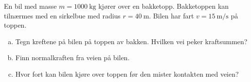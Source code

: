 %
En bil med masse $m = \SI{1000}{\kilo\gram}$ kjører over en bakketopp. Bakketoppen kan tilnærmes med en sirkelbue med radius $r = \SI{40}{\metre}$. Bilen har fart $v = \SI{15}{\metre\per\second}$ på toppen.
\begin{enumerate}[a)]
    \item Tegn kreftene på bilen på toppen av bakken. Hvilken vei peker kraftsummen?
    \item Finn normalkraften fra veien på bilen.
    \item Hvor fort kan bilen kjøre over toppen før den mister kontakten med veien?
\end{enumerate}
